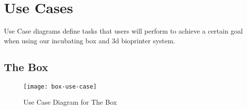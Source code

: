 \chapter{Use Cases}

Use Case diagrams define tasks that users will perform to achieve a certain goal when using our incubating box and 3d bioprinter system.

\section{The Box}

\begin{figure}[H]
\texttt{[image: box-use-case]}
\caption{\label{figure:box-use-case} Use Case Diagram for The Box}
\end{figure}


